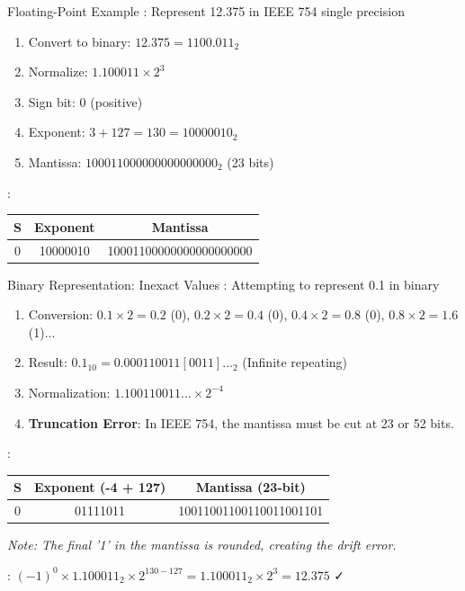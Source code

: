 \begin{frame}{Floating-Point Example}
: Represent 12.375 in IEEE 754 single precision

\vspace{0.3cm}
\begin{enumerate}
\item Convert to binary: $12.375 = 1100.011_2$
\item Normalize: $1.100011 \times 2^3$
\item Sign bit: 0 (positive)
\item Exponent: $3 + 127 = 130 = 10000010_2$
\item Mantissa: $100011000000000000000_2$ (23 bits)
\end{enumerate}

\vspace{0.3cm}
: 
\begin{center}
\begin{tabular}{|c|c|c|}
\hline
\textbf{S} & \textbf{Exponent} & \textbf{Mantissa} \\
\hline
0 & 10000010 & 10001100000000000000000 \\
\hline
\end{tabular}
\end{center}
\end{frame}

\begin{frame}{Binary Representation: Inexact Values}
: Attempting to represent 0.1 in binary

\vspace{0.3cm}
\begin{enumerate}
\item Conversion: $0.1 \times 2 = 0.2$ (0), $0.2 \times 2 = 0.4$ (0), $0.4 \times 2 = 0.8$ (0), $0.8 \times 2 = 1.6$ (1)...
\item Result: $0.1_{10} = 0.000110011[0011]..._2$ (Infinite repeating)
\item Normalization: $1.100110011... \times 2^{-4}$
\item \textbf{Truncation Error}: In IEEE 754, the mantissa must be cut at 23 or 52 bits.
\end{enumerate}

\vspace{0.3cm}
: 
\begin{center}
\begin{tabular}{|c|c|c|}
\hline
\textbf{S} & \textbf{Exponent (-4 + 127)} & \textbf{Mantissa (23-bit)} \\
\hline
0 & 01111011 & 10011001100110011001101 \\
\hline
\end{tabular}
\end{center}
\textit{Note: The final '1' in the mantissa is rounded, creating the drift error.}

: $(-1)^0 \times 1.100011_2 \times 2^{130-127} = 1.100011_2 \times 2^3 = 12.375$ ✓
\end{frame}

